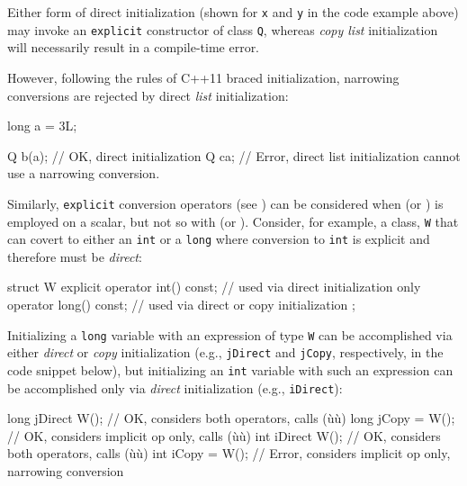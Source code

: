 \noindent Either form of direct initialization (shown for \lstinline!x! and
\lstinline!y! in the code example above) may invoke an \lstinline!explicit!
constructor of class \lstinline!Q!, whereas \emph{copy list} initialization
will necessarily result in a compile-time error.

However, following the rules of C++11 braced initialization, narrowing
conversions are rejected by direct \emph{list} initialization:

\begin{emcppslisting}[emcppsbatch=e13]
long a = 3L;

Q b(a);  // OK, direct initialization
Q c{a};  // Error, direct list initialization cannot use a narrowing conversion.
\end{emcppslisting}
    

\noindent Similarly, \lstinline!explicit! conversion operators (see
) can be considered when
 (or ) is employed on a scalar, but not so with
 (or ). Consider, for example, a class, \lstinline!W! that can
covert to either an \lstinline!int! or a \lstinline!long! where conversion to
\lstinline!int! is explicit and therefore must be \emph{direct}:

\begin{emcppslisting}[emcppsbatch=e14]
struct W
{
    explicit operator int()  const;  // used via direct initialization only
             operator long() const;  // used via direct or copy initialization
};
\end{emcppslisting}
    

\noindent Initializing a \lstinline!long! variable with an expression of type
\lstinline!W! can be accomplished via either \emph{direct} or \emph{copy}
initialization (e.g., \lstinline!jDirect! and \lstinline!jCopy!, respectively,
in the code snippet below), but initializing an \lstinline!int! variable
with such an expression can be accomplished only via \emph{direct}
initialization (e.g., \lstinline!iDirect!):

\begin{emcppslisting}[emcppsbatch=e14]
long jDirect {W()};  // OK, considers both operators, calls (ù{}ù)
long jCopy = {W()};  // OK, considers implicit op only, calls (ù{}ù)
int  iDirect {W()};  // OK, considers both operators, calls (ù{}ù)
int  iCopy = {W()};  // Error, considers implicit op only, narrowing conversion
\end{emcppslisting}
    

